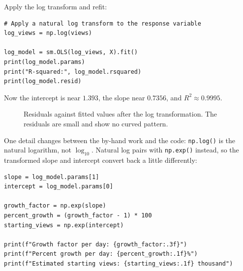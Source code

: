 Apply the log transform and refit:

\begin{verbatim}
# Apply a natural log transform to the response variable
log_views = np.log(views)

log_model = sm.OLS(log_views, X).fit()
print(log_model.params)
print("R-squared:", log_model.rsquared)
print(log_model.resid)
\end{verbatim}

Now the intercept is near $1.393$, the slope near $0.7356$, and $R^2 \approx 0.9995$. 

\begin{figure}[H]
    \centering
    \caption{Residuals against fitted values after the log transformation. The residuals are small and show no curved pattern.}
    \label{fig:logt-resid-log}
\end{figure}

One detail changes between the by-hand work and the code: \texttt{np.log()} is the natural logarithm, not $\log_{10}$. Natural log pairs with \texttt{np.exp()} instead, so the transformed slope and intercept convert back a little differently:

\begin{verbatim}
slope = log_model.params[1]
intercept = log_model.params[0]

growth_factor = np.exp(slope)
percent_growth = (growth_factor - 1) * 100
starting_views = np.exp(intercept)

print(f"Growth factor per day: {growth_factor:.3f}")
print(f"Percent growth per day: {percent_growth:.1f}%")
print(f"Estimated starting views: {starting_views:.1f} thousand")
\end{verbatim}

